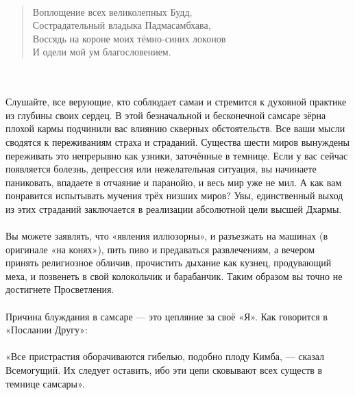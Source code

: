 \ru

\newpage
{}
\\
\begin{verse}
Воплощение всех великолепных Будд,\\
Сострадательный владыка Падмасамбхава,\\
Воссядь на короне моих тёмно-синих локонов\\
И одели мой ум благословением.
\end{verse}

\\ \\ Слушайте, все верующие, кто соблюдает самаи и стремится к духовной практике из глубины своих сердец. В этой безначальной и бесконечной самсаре зёрна плохой кармы подчинили вас влиянию скверных обстоятельств. Все ваши мысли сводятся к переживаниям страха и страданий. Существа шести миров вынуждены переживать это непрерывно как узники, заточённые в темнице. Если у вас сейчас появляется болезнь, депрессия или нежелательная ситуация, вы начинаете паниковать, впадаете в отчаяние и паранойю, и весь мир уже не мил. А как вам понравится испытывать мучения трёх низших миров? Увы, единственный выход из этих страданий заключается в реализации абсолютной цели высшей Дхармы.
\\ \\ Вы можете заявлять, что «явления иллюзорны», и разъезжать на машинах (в оригинале «на конях»), пить пиво и предаваться развлечениям, а вечером принять религиозное обличив, прочистить дыхание как кузнец, продувающий меха, и позвенеть в свой колокольчик и барабанчик. Таким образом вы точно не достигнете Просветления.
\\ \\ Причина блуждания в самсаре — это цепляние за своё «Я». Как говорится в «Послании Другу»:
\\ \\ «Все пристрастия оборачиваются гибелью, подобно плоду Кимба, — сказал Всемогущий. Их следует оставить, ибо эти цепи сковывают всех существ в темнице самсары».
\newpage
